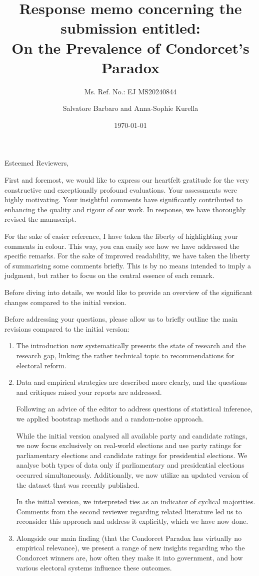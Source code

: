 \documentclass[a4paper, 12pt]{scrartcl}
\title{{\small Response memo concerning the submission entitled:} \\ On the Prevalence of Condorcet's Paradox }
\subtitle{Ms. Ref. No.: EJ MS20240844}
\author{Salvatore Barbaro and Anna-Sophie Kurella}
\date{\today}
\theoremstyle{break}
\begin{document}
\maketitle

\linenumbers

\noindent Esteemed Reviewers,

First and foremost, we would like to express our heartfelt gratitude for the very constructive and exceptionally profound evaluations. Your assessments were highly motivating. Your insightful comments have significantly contributed to enhancing the quality and rigour of our work. In response, we have thoroughly revised the manuscript.

For the sake of easier reference, I have taken the liberty of highlighting your comments in colour. This way, you can easily see how we have addressed the specific remarks. For the sake of improved readability, we have taken the liberty of summarising some comments briefly. This is by no means intended to imply a judgment, but rather to focus on the central essence of each remark.

Before diving into details, we would like to provide an overview of the significant changes compared to the initial version.

Before addressing your questions, please allow us to briefly outline the main revisions compared to the initial version:
\begin{enumerate}
\item The introduction now systematically presents the state of research and the research gap, linking the rather technical topic to recommendations for electoral reform.
\item Data and empirical strategies are described more clearly, and the questions and critiques raised your reports are addressed.
	
Following an advice of the editor to address questions of statistical inference, we applied bootstrap methods and a random-noise approach.
	
While the initial version analysed all available party and candidate ratings, we now focus exclusively on real-world elections and use party ratings for parliamentary elections and candidate ratings for presidential elections. We analyse both types of data only if parliamentary and presidential elections occurred simultaneously. Additionally, we now utilize an updated version of the dataset that was recently published. 
	
	
In the initial version, we interpreted ties as an indicator of cyclical majorities. Comments from the second reviewer regarding related literature led us to reconsider this approach and address it explicitly, which we have now done.
%
\item Alongside our main finding (that the Condorcet Paradox has virtually no empirical relevance), we present a range of new insights regarding who the Condorcet winners are, how often they make it into government, and how various electoral systems influence these outcomes.
\end{enumerate}
\end{document}
